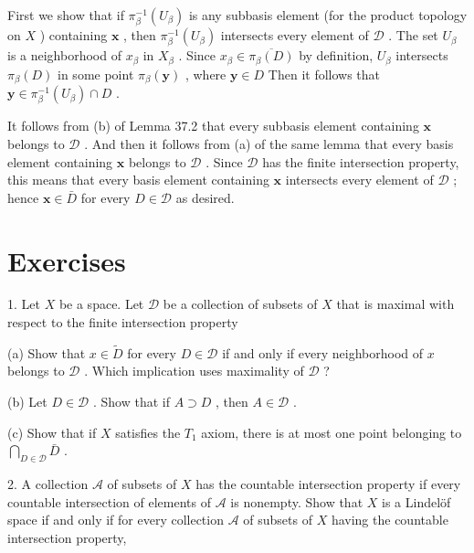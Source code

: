 \documentclass[10pt]{article}
\begin{document}
First we show that if \({\pi }_{\beta }^{-1}\left( {U}_{\beta }\right)\) is any subbasis element (for the product topology on \(X\) ) containing \(\mathbf{x}\) , then \({\pi }_{\beta }^{-1}\left( {U}_{\beta }\right)\) intersects every element of \(\mathcal{D}\) . The set \({U}_{\beta }\) is a neighborhood of \({x}_{\beta }\) in \({X}_{\beta }\) . Since \({x}_{\beta } \in  \overline{{\pi }_{\beta }\left( D\right) }\) by definition, \({U}_{\beta }\) intersects \({\pi }_{\beta }\left( D\right)\) in some point \({\pi }_{\beta }\left( \mathbf{y}\right)\) , where \(\mathbf{y} \in  D\) Then it follows that \(\mathbf{y} \in  {\pi }_{\beta }^{-1}\left( {U}_{\beta }\right)  \cap  D\) .

It follows from (b) of Lemma 37.2 that every subbasis element containing \(\mathbf{x}\) belongs to \(\mathcal{D}\) . And then it follows from (a) of the same lemma that every basis element containing \(\mathbf{x}\) belongs to \(\mathcal{D}\) . Since \(\mathcal{D}\) has the finite intersection property, this means that every basis element containing \(\mathbf{x}\) intersects every element of \(\mathcal{D}\) ; hence \(\mathbf{x} \in  \bar{D}\) for every \(D \in  \mathcal{D}\) as desired.

\section*{Exercises}

1. Let \(X\) be a space. Let \(\mathcal{D}\) be a collection of subsets of \(X\) that is maximal with respect to the finite intersection property

(a) Show that \(x \in  \widetilde{D}\) for every \(D \in  \mathcal{D}\) if and only if every neighborhood of \(x\) belongs to \(\mathcal{D}\) . Which implication uses maximality of \(\mathcal{D}\) ?

(b) Let \(D \in  \mathcal{D}\) . Show that if \(A \supset  D\) , then \(A \in  \mathcal{D}\) .

(c) Show that if \(X\) satisfies the \({T}_{1}\) axiom, there is at most one point belonging to \(\mathop{\bigcap }\limits_{{D \in  \mathcal{D}}}\bar{D}\) .

2. A collection \(\mathcal{A}\) of subsets of \(X\) has the countable intersection property if every countable intersection of elements of \(\mathcal{A}\) is nonempty. Show that \(X\) is a Lindelöf space if and only if for every collection \(\mathcal{A}\) of subsets of \(X\) having the countable intersection property,
\end{document}
